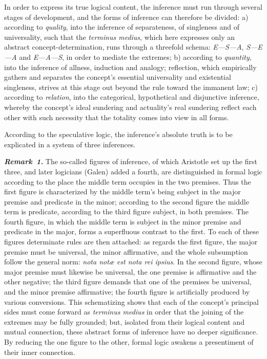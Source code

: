 \documentclass[12pt]{book}
\newcommand{\anm}[1]{\emph{\textbf{Remark~#1.}}}
\begin{document}
In order to express its true logical content, the inference must run through
several stages of development, and the forms of inference can therefore be
divided: a) according to \emph{quality}, into the inference of separateness,
of singleness and of universality, such that the \textit{terminus medius},
which here expresses only an abstract concept-determination, runs through a
threefold schema: \textit{E---S---A}, \textit{S---E---A} and
\textit{E---A---S}, in order to mediate the extremes; b) according to
\emph{quantity}, into the inference of allness, induction and analogy;
reflection, which empirically gathers and separates the concept's essential
universality and existential singleness, strives at this stage out beyond
the rule toward the immanent law; c) according to \emph{relation}, into the
categorical, hypothetical and disjunctive inference, whereby the concept's
ideal sundering and actuality's real sundering reflect each other with such
necessity that the totality comes into view in all forms.

According to the speculative logic, the inference's absolute truth is to be
explicated in a system of three inferences.

\anm{1} The so-called figures of inference, of which Aristotle set up the
first three, and later logicians (Galen) added a fourth, are distinguished
in formal logic according to the place the middle term occupies in the two
premises. Thus the first figure is characterized by the middle term's being
subject in the major premise and predicate in the minor; according to the
second figure the middle term is predicate, according to the third figure
subject, in both premises. The fourth figure, in which the middle term is
subject in the minor premise and predicate in the major, forms a superfluous
contrast to the first. To each of these figures determinate rules are then
attached: as regards the first figure, the major premise must be universal,
the minor affirmative, and the whole subsumption follow the general norm:
\textit{nota notæ est nota rei ipsius}. In the second figure, whose major
premise must likewise be universal, the one premise is affirmative and the
other negative; the third figure demands that one of the premises be
universal, and the minor premise affirmative; the fourth figure is
artificially produced by various conversions. This schematizing shows that
each of the concept's principal sides must come forward as \textit{terminus
medius} in order that the joining of the extremes may be fully grounded;
but, isolated from their logical content and mutual connection, these
abstract forms of inference have no deeper significance. By reducing the one
figure to the other, formal logic awakens a presentiment of their inner
connection.
\end{document}
